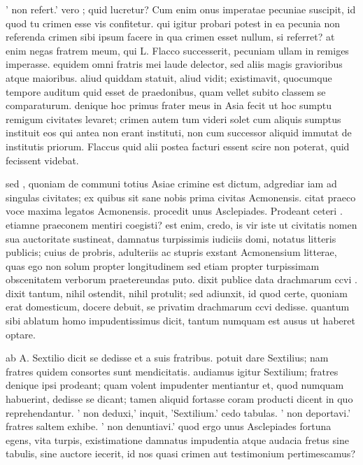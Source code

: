  ' non refert.' vero ; quid lucretur? Cum enim onus imperatae pecuniae suscipit, id quod tu crimen esse vis confitetur. qui igitur probari potest in ea pecunia non referenda crimen sibi ipsum facere in qua crimen esset nullum, si referret? at enim negas fratrem meum, qui L. Flacco successerit, pecuniam ullam in remiges imperasse. equidem omni fratris mei laude delector, sed aliis magis gravioribus atque maioribus. aliud quiddam statuit, aliud vidit; existimavit, quocumque tempore auditum quid esset de praedonibus, quam vellet subito classem se comparaturum. denique hoc primus frater meus in Asia fecit ut hoc sumptu remigum civitates levaret; crimen autem tum videri solet cum aliquis sumptus instituit eos qui antea non erant instituti, non cum successor aliquid immutat de institutis priorum. Flaccus quid alii postea facturi essent scire non poterat, quid fecissent videbat.

 sed , quoniam de communi totius Asiae crimine est dictum, adgrediar iam ad singulas civitates; ex quibus sit sane nobis prima civitas Acmonensis. citat praeco voce maxima legatos Acmonensis. procedit unus Asclepiades. Prodeant ceteri . etiamne praeconem mentiri coegisti? est enim, credo, is vir iste ut civitatis nomen sua auctoritate sustineat, damnatus turpissimis iudiciis domi, notatus litteris publicis; cuius de probris, adulteriis ac stupris exstant Acmonensium litterae, quas ego non solum propter longitudinem sed etiam propter turpissimam obscenitatem verborum praetereundas puto. dixit publice data drachmarum ccvi . dixit tantum, nihil ostendit, nihil protulit; sed adiunxit, id quod certe, quoniam erat domesticum, docere debuit, se privatim drachmarum ccvi dedisse. quantum sibi ablatum homo impudentissimus dicit, tantum numquam est ausus ut haberet optare.

 ab A. Sextilio dicit se dedisse et a suis fratribus. potuit dare Sextilius; nam fratres quidem consortes sunt mendicitatis. audiamus igitur Sextilium; fratres denique ipsi prodeant; quam volent impudenter mentiantur et, quod numquam habuerint, dedisse se dicant; tamen aliquid fortasse coram producti dicent in quo reprehendantur. ' non deduxi,' inquit, 'Sextilium.' cedo tabulas. ' non deportavi.' fratres saltem exhibe. ' non denuntiavi.' quod ergo unus Asclepiades fortuna egens, vita turpis, existimatione damnatus impudentia atque audacia fretus sine tabulis, sine auctore iecerit, id nos quasi crimen aut testimonium pertimescamus?

